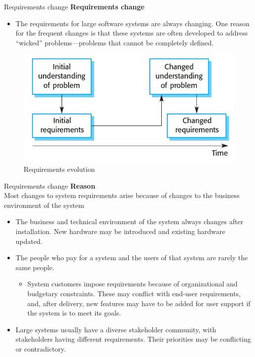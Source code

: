 \documentclass{beamer}
\begin{document}
\begin{frame}{Requirements change}
	\textbf{Requirements change}
	\begin{itemize}
		\item The requirements for large software systems are always changing. One reason for the frequent changes is that these systems are often developed to address “wicked” problems—problems that cannot be completely defined. 
	\end{itemize}
\begin{figure}
	\includegraphics[scale=.45]{img/m2_8.jpg}
	\caption{Requirements evolution}
\end{figure}
\end{frame}
\begin{frame}{Requirements change}
	\textbf{Reason}\\
	 Most changes to system requirements arise because of changes to 
	the business environment of the system
	\begin{itemize}
		\item The business and technical environment of the system always changes after installation. New hardware may be introduced and existing hardware updated. 
	\item The people who pay for a system and the users of that system are rarely the same people.
	\begin{itemize}
		\item System customers impose requirements because of organizational and budgetary constraints. These may conflict with end-user requirements, and, after delivery, new features may have to be added for user support if the system is to meet its goals.
	\end{itemize}  
	\item Large systems usually have a diverse stakeholder community, with stakeholders having different requirements. Their priorities may be conflicting or contradictory. 	
	\end{itemize}
\end{frame}
\end{document}
